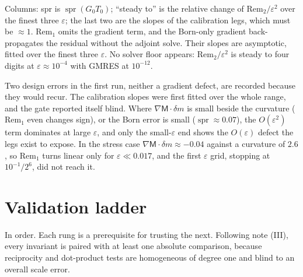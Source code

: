 \documentclass[11pt,a4paper]{article}
\newcommand{\Tz}{T_0}
\newcommand{\Gz}{G_0}
\begin{document}
\noindent Columns: spr is $\operatorname{spr}(\Gz\Tz)$; ``steady to'' is the relative change of
$\mathrm{Rem}_2/\varepsilon^2$ over the finest three $\varepsilon$; the last two are the slopes of the
calibration legs, which must be $\approx1$. $\mathrm{Rem}_1$ omits the gradient term, and the
Born-only gradient back-propagates the residual without the adjoint solve. Their slopes are
asymptotic, fitted over the finest three $\varepsilon$. No solver floor appears: $\mathrm{Rem}_2/\varepsilon^2$ is steady to four digits
at $\varepsilon\approx10^{-4}$ with GMRES at $10^{-12}$.

Two design errors in the first run, neither a gradient defect, are recorded because they would
recur. The calibration slopes were first fitted over the whole range, and the gate reported itself
blind. Where $\nabla\mathsf{M}\cdot\delta m$ is small beside the curvature ($\mathrm{Rem}_1$ even changes sign), or the
Born error is small ($\operatorname{spr}\approx0.07$), the $O(\varepsilon^2)$ term dominates at large $\varepsilon$,
and only the small-$\varepsilon$ end shows the $O(\varepsilon)$ defect the legs exist to expose. In the
stress case $\nabla\mathsf{M}\cdot\delta m\approx-0.04$ against a curvature of $2.6$, so $\mathrm{Rem}_1$ turns linear
only for $\varepsilon\ll0.017$, and the first $\varepsilon$ grid, stopping at $10^{-1}/2^6$, did not
reach it.

\section{Validation ladder}\label{sec:gates}

In order. Each rung is a prerequisite for trusting the next. Following note (III), every invariant
is paired with at least one absolute comparison, because reciprocity and dot-product tests are
homogeneous of degree one and blind to an overall scale error.
\end{document}
